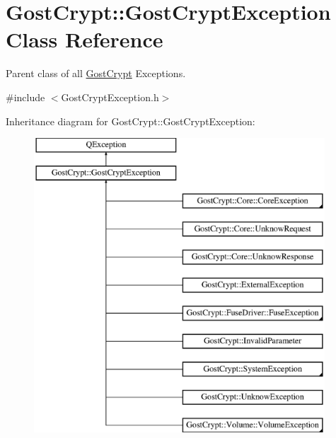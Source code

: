 \hypertarget{class_gost_crypt_1_1_gost_crypt_exception}{}\section{Gost\+Crypt\+:\+:Gost\+Crypt\+Exception Class Reference}
\label{class_gost_crypt_1_1_gost_crypt_exception}


Parent class of all \hyperlink{namespace_gost_crypt}{Gost\+Crypt} Exceptions.  




{\ttfamily \#include $<$Gost\+Crypt\+Exception.\+h$>$}

Inheritance diagram for Gost\+Crypt\+:\+:Gost\+Crypt\+Exception\+:\begin{figure}[H]
\begin{center}
\leavevmode
\includegraphics[height=11.000000cm]{class_gost_crypt_1_1_gost_crypt_exception}
\end{center}
\end{figure}
